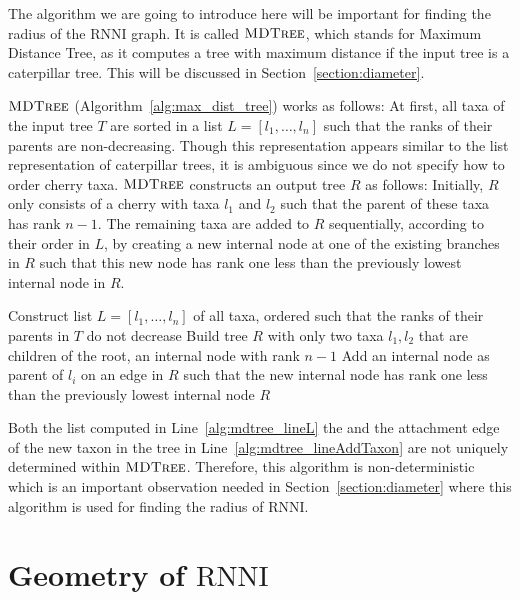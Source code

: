 \documentclass{amsart}
\newcommand{\rnni}{\mathrm{RNNI}}
\newcommand{\mdtree}{\textsc{MDTree}}
\begin{document}
The algorithm we are going to introduce here will be important for finding the radius of the $\rnni$ graph.
It is called $\mdtree$, which stands for Maximum Distance Tree, as it computes a tree with maximum distance if the input tree is a caterpillar tree.
This will be discussed in Section~\ref{section:diameter}.

$\mdtree$ (Algorithm~\ref{alg:max_dist_tree}) works as follows:
At first, all taxa of the input tree $T$ are sorted in a list $L = [l_1, \ldots, l_n]$ such that the ranks of their parents are non-decreasing.
Though this representation appears similar to the list representation of caterpillar trees, it is ambiguous since we do not specify how to order cherry taxa.
$\mdtree$ constructs an output tree $R$ as follows:
Initially, $R$ only consists of a cherry with taxa $l_1$ and $l_2$ such that the parent of these taxa has rank $n-1$.
The remaining taxa are added to $R$ sequentially, according to their order in $L$, by creating a new internal node at one of the existing branches in $R$ such that this new node has rank one less than the previously lowest internal node in $R$.

\begin{algorithm}[H]
\caption{$\mdtree(T)$}
\label{alg:max_dist_tree}
\begin{algorithmic}[1]
\STATE Construct list $L=[l_1, \ldots, l_n]$ of all taxa, ordered such that the ranks of their parents in $T$ do not decrease \label{alg:mdtree_lineL}
\STATE Build tree $R$ with only two taxa $l_1, l_2$ that are children of the root, an internal node with rank $n-1$
\STATE Add an internal node as parent of $l_i$ on an edge in $R$ such that the new internal node has rank one less than the previously lowest internal node \label{alg:mdtree_lineAddTaxon}
\ENDFOR
\RETURN $R$
\end{algorithmic}
\end{algorithm}

Both the list computed in Line~\ref{alg:mdtree_lineL} the and the attachment edge of the new taxon in the tree in Line~\ref{alg:mdtree_lineAddTaxon} are not uniquely determined within $\mdtree$.
Therefore, this algorithm is non-deterministic which is an important observation needed in Section~\ref{section:diameter} where this algorithm is used for finding the radius of $\rnni$.

\section{Geometry of $\rnni$}
\label{section:geometry}
\end{document}
